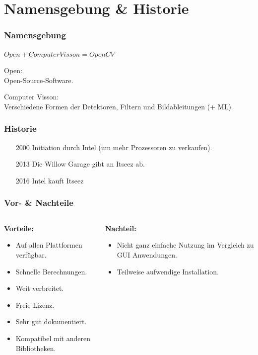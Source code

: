 \documentclass{beamer}
\begin{document}
\begin{frame}
\titlepage
\end{frame}

\section{Namensgebung \& Historie}
\begin{frame} \frametitle{Namensgebung}
	$Open + Computer Visson = OpenCV$ \pause
	\begin{description}
		\item Open:\\
		 Open-Source-Software.\pause
		\item Computer Visson:\\
		 Verschiedene Formen der Detektoren, Filtern und Bildableitungen (+ ML).
	\end{description}
\cite{Bradski2008}
\end{frame}

\begin{frame} \frametitle{Historie}
	\begin{itemize}
		\item [2000] Initiation durch Intel (um mehr Prozessoren zu verkaufen). \pause
		\item [2013] Die Willow Garage gibt an Itseez ab. \pause
		\item [2016] Intel kauft Itseez 
	\end{itemize}
	\cite{Bradski2008}
\end{frame}

\begin{frame} \frametitle{Vor- \& Nachteile}
\begin{columns}
	\begin{column}{0.5\textwidth}
		\textbf{Vorteile:}
		\begin{itemize}
			\item Auf allen Plattformen verfügbar.
			\item Schnelle Berechnungen.
			\item Weit verbreitet.
			\item Freie Lizenz.
			\item Sehr gut dokumentiert.
			\item Kompatibel mit anderen Bibliotheken.
		\end{itemize}
	\end{column}
	
	
	\begin{column}{0.5\textwidth}
	\textbf{Nachteil:}
	\begin{itemize}
		\item Nicht ganz einfache Nutzung im Vergleich zu GUI Anwendungen.
		\item Teilweise aufwendige Installation. 
	\end{itemize}
\end{column}
\end{columns}
\end{frame}
\end{document}
